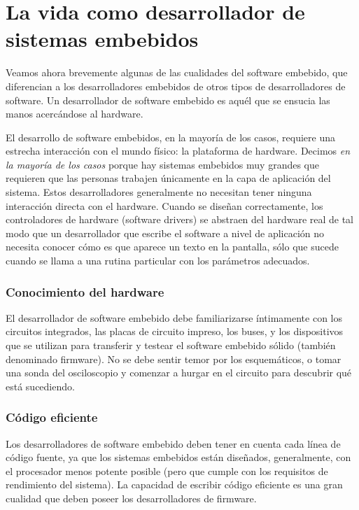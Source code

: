 \documentclass[output=paper, 
colorlinks,
citecolor=brown,
newtxmath
]{langscibook}
\begin{document}
\section {La vida como desarrollador de sistemas embebidos}

Veamos ahora brevemente algunas de las cualidades del software embebido, 
que diferencian a los desarrolladores embebidos de otros tipos de desarrolladores de software. 
Un desarrollador de software embebido es aquél que se ensucia las manos acercándose al hardware.

El desarrollo de software embebidos, en la mayoría de los casos, requiere una estrecha interacción 
con el mundo físico: la plataforma de hardware. Decimos \textit{en la mayoría de los casos}
porque hay sistemas embebidos muy grandes que requieren que las personas trabajen 
únicamente en la capa de aplicación del sistema. 
Estos desarrolladores generalmente no necesitan tener ninguna 
interacción directa con el hardware. Cuando se diseñan correctamente, los controladores 
de hardware (software drivers) se abstraen del hardware real de tal modo
que un desarrollador que escribe el software a nivel de aplicación 
no necesita conocer cómo es que aparece un texto en la pantalla, 
sólo que sucede cuando se llama a una rutina particular con los parámetros adecuados.


\subsubsection *{Conocimiento del hardware}

El desarrollador de software embebido debe familiarizarse íntimamente con los 
circuitos integrados, las placas de circuito impreso, los buses, y los dispositivos 
que se utilizan para transferir y testear el software embebido sólido (también denominado firmware). 
No se debe sentir temor por los esquemáticos, o tomar una sonda del osciloscopio y 
comenzar a hurgar en el circuito para descubrir qué está sucediendo.



\subsubsection *{Código eficiente}

Los desarrolladores de software embebido deben tener en cuenta
cada línea de código fuente, ya que los sistemas embebidos 
están diseñados, generalmente, con el procesador menos potente posible
(pero que cumple con los requisitos de rendimiento del sistema). 
La capacidad de escribir código eficiente es una gran cualidad
que deben poseer los desarrolladores de firmware.
\end{document}
